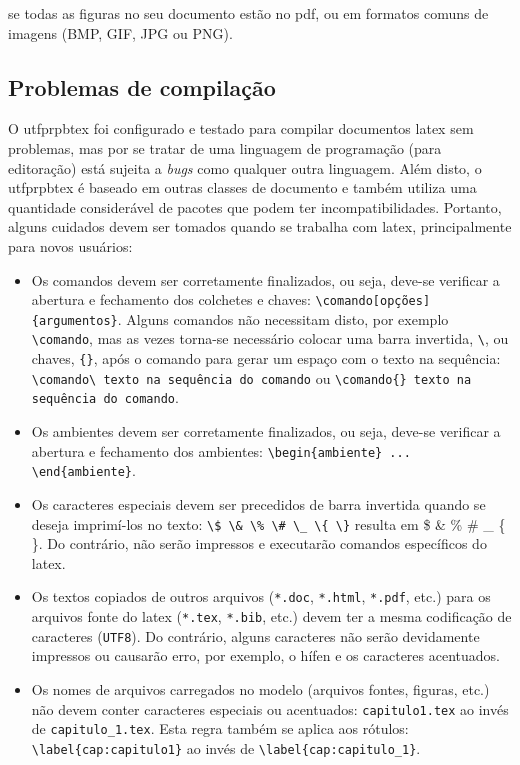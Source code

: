 \noindent se todas as figuras no seu documento estão no \gls{pdf}, ou em formatos comuns de imagens (BMP, GIF, JPG ou PNG).

\subsection{Problemas de compilação}\label{sec:problemas}

O \gls{utfprpbtex} foi configurado e testado para compilar documentos \gls{latex} sem problemas, mas por se tratar de uma linguagem de programação (para editoração) está sujeita a \textit{bugs} como qualquer outra linguagem. Além disto, o \gls{utfprpbtex} é baseado em outras classes de documento e também utiliza uma quantidade considerável de pacotes que podem ter incompatibilidades. Portanto, alguns cuidados devem ser tomados quando se trabalha com \gls{latex}, principalmente para novos usuários:

\begin{itemize}%
    \item Os comandos devem ser corretamente finalizados, ou seja, deve-se verificar a abertura e fechamento dos colchetes e chaves: \verb|\comando[opções]{argumentos}|. Alguns comandos não necessitam disto, por exemplo \verb|\comando|, mas as vezes torna-se necessário colocar uma barra invertida, \verb|\|, ou chaves, \verb|{}|, após o comando para gerar um espaço com o texto na sequência: \verb|\comando\ texto na sequência do comando| ou \verb|\comando{} texto na sequência do comando|.
    \item Os ambientes devem ser corretamente finalizados, ou seja, deve-se verificar a abertura e fechamento dos ambientes: \verb|\begin{ambiente} ... \end{ambiente}|.
    \item Os caracteres especiais devem ser precedidos de barra invertida quando se deseja imprimí-los no texto: \verb|\$ \& \% \# \_ \{ \}| resulta em \$ \& \% \# \_ \{ \}. Do contrário, não serão impressos e executarão comandos específicos do \gls{latex}.
    \item Os textos copiados de outros arquivos (\texttt{*.doc}, \texttt{*.html}, \texttt{*.pdf}, etc.) para os arquivos fonte do \gls{latex} (\texttt{*.tex}, \texttt{*.bib}, etc.) devem ter a mesma codificação de caracteres (\texttt{UTF8}). Do contrário, alguns caracteres não serão devidamente impressos ou causarão erro, por exemplo, o hífen e os caracteres acentuados.
    \item Os nomes de arquivos carregados no modelo (arquivos fontes, figuras, etc.) não devem conter caracteres especiais ou acentuados: \verb|capitulo1.tex| ao invés de \verb|capitulo_1.tex|. Esta regra também se aplica aos rótulos: \verb|\label{cap:capitulo1}| ao invés de \verb|\label{cap:capitulo_1}|.
\end{itemize}

